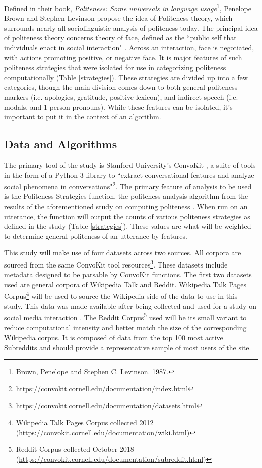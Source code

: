\documentclass{article}
\begin{document}
Defined in their book, \textit{Politeness: Some universals in language usage}\footnote{Brown, Penelope and Stephen C. Levinson. 1987.}, Penelope Brown and Stephen Levinson propose the idea of Politeness theory, which surrounds nearly all sociolinguistic analysis of politeness today. The principal idea of politeness theory concerns theory of face, defined as the ``public self that individuals enact in social interaction" \cite{PT}. Across an interaction, face is negotiated, with actions promoting positive, or negative face. It is major features of such politeness strategies that were isolated for use in categorizing politeness computationally (Table \ref{strategies}). These strategies are divided up into a few categories, though the main division comes down to both general politeness markers (i.e. apologies, gratitude, positive lexicon), and indirect speech (i.e. modals, and 1 person pronouns). While these features can be isolated, it's important to put it in the context of an algorithm.

\subsection{Data and Algorithms}
The primary tool of the study is Stanford University's ConvoKit \cite{CONVK}, a suite of tools in the form of a Python 3 library to ``extract conversational features and analyze social phenomena in conversations"\footnote{\url{https://convokit.cornell.edu/documentation/index.html}}. The primary feature of analysis to be used is the Politeness Strategies function, the politeness analysis algorithm from the results of the aforementioned study on computing politeness \cite{CAP}. When run on an utterance, the function will output the counts of various politeness strategies as defined in the study (Table \ref{strategies}). These values are what will be weighted to determine general politeness of an utterance by features. 

This study will make use of four datasets across two sources. All corpora are sourced from the same ConvoKit tool resources\footnote{\url{https://convokit.cornell.edu/documentation/datasets.html}}. These datasets include metadata designed to be parsable by ConvoKit functions. The first two datasets used are general corpora of Wikipedia Talk and Reddit. Wikipedia Talk Pages Corpus\footnote{Wikipedia Talk Pages Corpus collected 2012 (\url{https://convokit.cornell.edu/documentation/wiki.html})} will be used to source the Wikipedia-side of the data to use in this study. This data was made available after being collected and used for a study on social media interaction \cite{EOP}. The Reddit Corpus\footnote{Reddit Corpus collected October 2018 (\url{https://convokit.cornell.edu/documentation/subreddit.html})} used will be its small variant to reduce computational intensity and better match the size of the corresponding Wikipedia corpus. It is composed of data from the top 100 most active Subreddits and should provide a representative sample of most users of the site.
\end{document}
